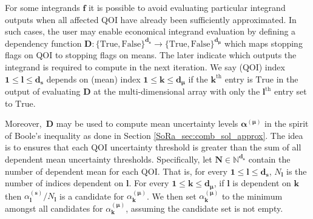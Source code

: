 \documentclass[graybox]{svmult}
\begin{document}
For some integrands $\boldsymbol{f}$ it is possible to avoid evaluating particular integrand outputs when all affected QOI have already been sufficiently approximated. In such cases, the user may enable economical integrand evaluation by defining a dependency function $\boldsymbol{D}: \{\text{True},\text{False}\}^{\boldsymbol{d}_{\boldsymbol{s}}} \to \{\text{True},\text{False}\}^{\boldsymbol{d}_{\boldsymbol{\mu}}}$ which maps stopping flags on QOI to stopping flags on means. The later indicate which outputs the integrand is required to compute in the next iteration.  We say (QOI) index $\boldsymbol{1} \leq \boldsymbol{l} \leq \boldsymbol{d}_{\boldsymbol{s}}$ depends on (mean) index $\boldsymbol{1} \leq \boldsymbol{k} \leq \boldsymbol{d}_{\boldsymbol{\mu}}$ if the $\boldsymbol{k}^\text{th}$ entry is $\text{True}$ in the output of evaluating $\boldsymbol{D}$ at the multi-dimensional array with only the $\boldsymbol{l}^\text{th}$ entry set to $\text{True}$.

Moreover, $\,\boldsymbol{D}$ may be used to compute mean uncertainty levels $\boldsymbol{\alpha}^{(\boldsymbol{\mu})}$ in the spirit of Boole's inequality as done in Section \ref{SoRa_sec:comb_sol_approx}. The idea is to ensures that each QOI uncertainty threshold is greater than the sum of all dependent mean uncertainty thresholds. Specifically, let $\boldsymbol{N} \in \mathbb{N}^{\boldsymbol{d}_{\boldsymbol{s}}}$ contain the number of dependent mean for each QOI. That is, for every $\boldsymbol{1} \leq \boldsymbol{l} \leq \boldsymbol{d}_{\boldsymbol{s}}$, $N_{\boldsymbol{l}}$ is the number of indices dependent on $\boldsymbol{l}$. For every $\boldsymbol{1} \leq \boldsymbol{k} \leq \boldsymbol{d}_{\boldsymbol{\mu}}$, if $\boldsymbol{l}$ is dependent on $\boldsymbol{k}$ then $\alpha_{\boldsymbol{l}}^{(\boldsymbol{s})}/N_{\boldsymbol{l}}$ is a candidate for $\alpha_{\boldsymbol{k}}^{(\boldsymbol{\mu})}$. We then set $\alpha_{\boldsymbol{k}}^{(\boldsymbol{\mu})}$ to the minimum amongst all candidates for $\alpha_{\boldsymbol{k}}^{(\boldsymbol{\mu})}$, assuming the candidate set is not empty.
\end{document}
